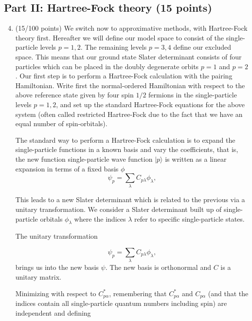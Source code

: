 \documentclass[prc]{revtex4} \usepackage[dvips]{graphicx}
\begin{document}
\subsection*{Part II: Hartree-Fock theory (15 points)}

\begin{enumerate}
\setcounter{enumi}{3}
\item  (15/100 points) We switch now to approximative methods, with Hartree-Fock
  theory first. Hereafter we will define
  our model space to consist of the single-particle levels $p=1,2$.
  The remaining levels $p=3,4$ define our excluded space.  This means
  that our ground state Slater determinant consists of four particles
  which can be placed in the doubly degenerate orbits $p=1$ and $p=2$.
  Our first step is to perform a Hartree-Fock calculation with the
  pairing Hamiltonian.  Write first the normal-ordered Hamiltonian
  with respect to the above reference state given by four spin $1/2$
  fermions in the single-particle levels $p=1,2$, and set up the
  standard Hartree-Fock equations for the above system (often called
  restricted Hartree-Fock due to the fact that we have an equal number
  of spin-orbitals).

 The standard way to perform a Hartree-Fock calculation is to
expand the single-particle functions in a known basis  and vary the coefficients,  that is, the new function single-particle wave function $|p\rangle$ is written as a linear expansion in terms of a fixed basis $\phi$
\begin{equation*} 
\psi_p  = \sum_{\lambda} C_{p\lambda}\phi_{\lambda},
\end{equation*}

This leads to a new Slater determinant which is related to the
previous via a unitary transformation.  
We consider a Slater determinant built up of single-particle orbitals
$\phi_{\lambda}$ where the indices $\lambda$ refer to specific
single-particle states. 

The unitary transformation

\begin{equation*}
\psi_p  = \sum_{\lambda} C_{p\lambda}\phi_{\lambda},
\end{equation*}
brings us into the new basis $\psi$.  The new basis is orthonormal and $C$ is a unitary matrix.


Minimizing with respect to $C^*_{p\alpha}$, remembering that
$C^*_{p\alpha}$ and $C_{p\alpha}$ (and that the indices contain all
single-particle quantum numbers including spin) are independent and
defining


\end{enumerate}
\end{document}
